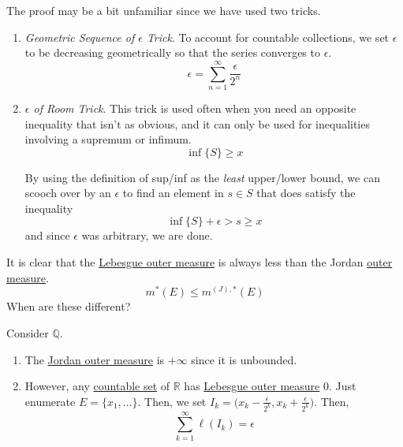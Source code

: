   The proof may be a bit unfamiliar since we have used two tricks. 
  \begin{enumerate}
    \item \textit{Geometric Sequence of $\epsilon$ Trick}. To account for countable collections, we set $\epsilon$ to be decreasing geometrically so that the series converges to $\epsilon$. 
    \begin{equation}
      \epsilon = \sum_{n=1}^\infty \frac{\epsilon}{2^n}
    \end{equation}

    \item \textit{$\epsilon$ of Room Trick}. This trick is used often when you need an opposite inequality that isn't as obvious, and it can only be used for inequalities involving a supremum or infimum. 
    \begin{equation}
      \inf\{S\} \geq x
    \end{equation}

    By using the definition of sup/inf as the \textit{least} upper/lower bound, we can scooch over by an $\epsilon$ to find an element in $s \in S$ that does satisfy the inequality 
    \begin{equation}
      \inf\{S\} + \epsilon > s \geq x
    \end{equation}
    and since $\epsilon$ was arbitrary, we are done. 
  \end{enumerate}

  It is clear that the \hyperref[def:lebesgue-outer-measure]{Lebesgue outer measure} is always less than the Jordan \hyperref[def:outer-measure]{outer measure}. 
  \begin{equation}
    m^\ast (E) \leq m^{(J), \ast} (E) 
  \end{equation}
  When are these different? 

  \begin{example}
    \label{ex:lebesgue-outer-measure-much-smaller-than-jordan}
    Consider $\mathbb{Q}$. 
    \begin{enumerate}
      \item The \hyperref[def:jordan-outer-inner-measure]{Jordan outer measure} is $+\infty$ since it is unbounded. 
      \item However, any \hyperref[st-def:countable]{countable set} of $\mathbb{R}$ has \hyperref[def:lebesgue-outer-measure]{Lebesgue outer measure} $0$. Just enumerate $E = \{x_1, \ldots \}$. Then, we set $I_k = \big( x_k - \frac{\epsilon}{2^k}, x_k + \frac{\epsilon}{2^k} \big)$. Then, 
      \begin{equation}
        \sum_{k=1}^\infty \ell(I_k) = \epsilon
      \end{equation}
    \end{enumerate}
  \end{example}

